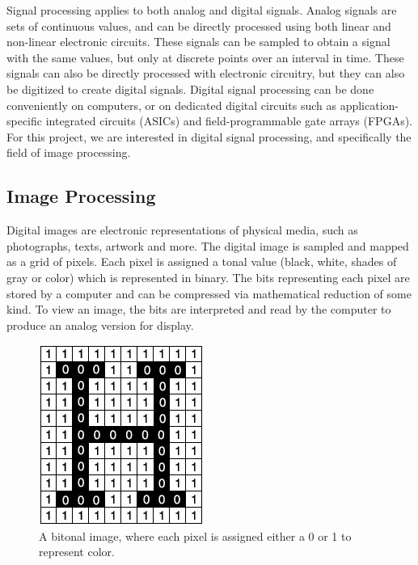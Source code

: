 \documentclass{article}
\begin{document}
Signal processing applies to both analog and digital signals.  Analog signals are sets of continuous values, and can be directly processed using both linear and non-linear electronic circuits.  These signals can be sampled to obtain a signal with the same values, but only at discrete points over an interval in time.  These signals can also be directly processed with electronic circuitry, but they can also be digitized to create digital signals.  Digital signal processing can be done conveniently on computers, or on dedicated digital circuits such as application-specific integrated circuits (ASICs) and field-programmable gate arrays (FPGAs).  For this project, we are interested in digital signal processing, and specifically the field of image processing. \\

		\subsection*{Image Processing}

Digital images are electronic representations of physical media, such as photographs, texts, artwork and more.  The digital image is sampled and mapped as a grid of pixels.  Each pixel is assigned a tonal value (black, white, shades of gray or color) which is represented in binary.  The bits representing each pixel are stored by a computer and can be compressed via mathematical reduction of some kind.  To view an image, the bits are interpreted and read by the computer to produce an analog version for display. \\ 

\begin{figure}[H]
      			\centering
      			\includegraphics[scale=0.75]{./images/research_image_processing_1}
			\caption{A bitonal image, where each pixel is assigned either a 0 or 1 to represent color.}
			\label{fig:research_image_processing_1}
   		 \end{figure}
\end{document}
